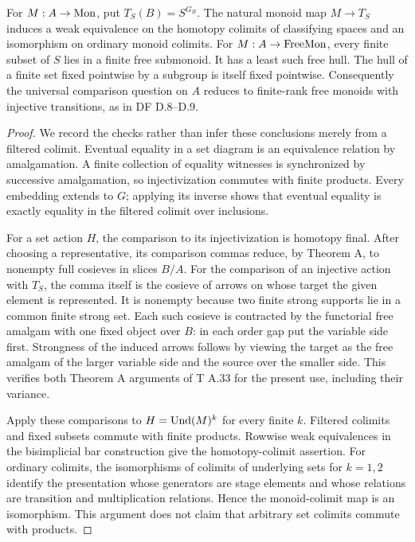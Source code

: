 \begin{proposition}
\label{G:saturation}
For $M:A\to\mathrm{Mon}$, put $T_S(B)=S^{G_B}$.  The natural monoid map
$M\to T_S$ induces a weak equivalence on the homotopy colimits of
classifying spaces and an isomorphism on ordinary monoid colimits.
For $M:A\to\mathrm{FreeMon}$, every finite subset of $S$ lies in a finite
free submonoid.  It has a least such free hull.  The hull of a finite
set fixed pointwise by a subgroup is itself fixed pointwise.
Consequently the universal comparison question on $A$ reduces to
finite-rank free monoids with injective transitions, as in DF D.8--D.9.
\end{proposition}
\begin{proof}
We record the checks rather than infer these conclusions merely
from a filtered colimit.  Eventual equality in a set diagram is an
equivalence relation by amalgamation.  A finite collection of
equality witnesses is synchronized by successive amalgamation, so
injectivization commutes with finite products.  Every embedding
extends to $G$; applying its inverse shows that eventual equality
is exactly equality in the filtered colimit over inclusions.

For a set action $H$, the comparison to its injectivization is
homotopy final.  After choosing a representative, its comparison
commas reduce, by Theorem A, to nonempty full cosieves in slices
$B/A$.  For the comparison of an injective action with $T_S$, the
comma itself is the cosieve of arrows on whose target the given
element is represented.  It is nonempty because two finite strong
supports lie in a common finite strong set.  Each such cosieve is
contracted by the functorial free amalgam with one fixed object over
$B$: in each order gap put the variable side first.  Strongness of
the induced arrows follows by viewing the target as the free
amalgam of the larger variable side and the source over the smaller
side.  This verifies both Theorem A arguments of T A.33 for the
present use, including their variance.

Apply these comparisons to $H=\operatorname{Und}(M)^k$ for every finite $k$.
Filtered colimits and fixed subsets commute with finite products.
Rowwise weak equivalences in the bisimplicial bar construction give
the homotopy-colimit assertion.  For ordinary colimits, the
isomorphisms of colimits of underlying sets for $k=1,2$ identify
the presentation whose generators are stage elements and whose
relations are transition and multiplication relations.  Hence the
monoid-colimit map is an isomorphism.  This argument does not claim
that arbitrary set colimits commute with products.


\end{proof}
